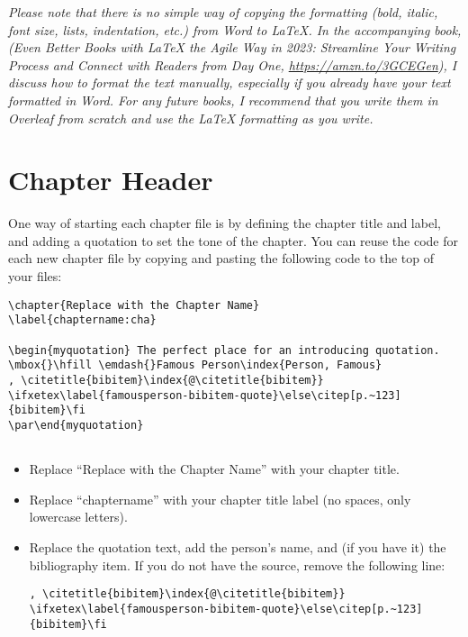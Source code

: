 \textit{Please note that there is no simple way of copying the formatting (bold, italic, font size, lists, indentation, etc.) from Word to LaTeX. In the accompanying book, (\textit{Even Better Books with LaTeX the Agile Way in 2023: Streamline Your Writing Process and Connect with Readers from Day One}, \url{https://amzn.to/3GCEGen}), I discuss how to format the text manually, especially if you already have your text formatted in Word. For any future books, I recommend that you write them in Overleaf from scratch and use the LaTeX formatting as you write.}


\section{Chapter Header}

One way of starting each chapter file is by defining the chapter title and label, and adding a quotation to set the tone of the chapter. You can reuse the code for each new chapter file by copying and pasting the following code to the top of your files:

\begin{lstlisting}
\chapter{Replace with the Chapter Name}
\label{chaptername:cha}

\begin{myquotation} The perfect place for an introducing quotation.
\mbox{}\hfill \emdash{}Famous Person\index{Person, Famous}
, \citetitle{bibitem}\index{@\citetitle{bibitem}} \ifxetex\label{famousperson-bibitem-quote}\else\citep[p.~123]{bibitem}\fi
\par\end{myquotation}


\end{lstlisting}


\begin{itemize}
\item Replace ``Replace with the Chapter Name'' with your chapter title.
\item Replace ``chaptername'' with your chapter title label (no spaces, only lowercase letters).
\item Replace the quotation text, add the person's name, and (if you have it) the bibliography item. If you do not have the source, remove the following line:

\begin{lstlisting}
, \citetitle{bibitem}\index{@\citetitle{bibitem}} \ifxetex\label{famousperson-bibitem-quote}\else\citep[p.~123]{bibitem}\fi
\end{lstlisting}
\end{itemize}

